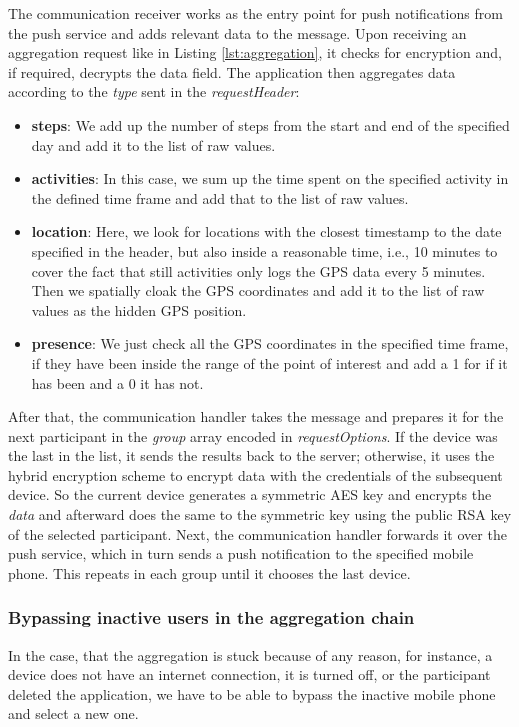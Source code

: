 The communication receiver works as the entry point for push notifications from the push service and adds relevant data to the message. Upon receiving an aggregation request like in Listing \ref{lst:aggregation}, it checks for encryption and, if required, decrypts the data field. The application then aggregates data according to the \textit{type} sent in the \textit{requestHeader}:
\begin{itemize}
    \item \textbf{steps}: We add up the number of steps from the start and end of the specified day and add it to the list of raw values.
    \item \textbf{activities}: In this case, we sum up the time spent on the specified activity in the defined time frame and add that to the list of raw values.
    \item \textbf{location}: Here, we look for locations with the closest timestamp to the date specified in the header, but also inside a reasonable time, i.e., 10 minutes to cover the fact that still activities only logs the GPS data every 5 minutes. Then we spatially cloak the GPS coordinates and add it to the list of raw values as the hidden GPS position.
    \item \textbf{presence}: We just check all the GPS coordinates in the specified time frame, if they have been inside the range of the point of interest and add a 1 for if it has been and a 0 it has not.
\end{itemize}

After that, the communication handler takes the message and prepares it for the next participant in the \textit{group} array encoded in \textit{requestOptions}. If the device was the last in the list, it sends the results back to the server; otherwise, it uses the hybrid encryption scheme to encrypt data with the credentials of the subsequent device. So the current device generates a symmetric AES key and encrypts the \textit{data} and afterward does the same to the symmetric key using the public RSA key of the selected participant. Next, the communication handler forwards it over the push service, which in turn sends a push notification to the specified mobile phone. This repeats in each group until it chooses the last device.

\subsubsection{Bypassing inactive users in the aggregation chain}
In the case, that the aggregation is stuck because of any reason, for instance, a device does not have an internet connection, it is turned off, or the participant deleted the application, we have to be able to bypass the inactive mobile phone and select a new one.

